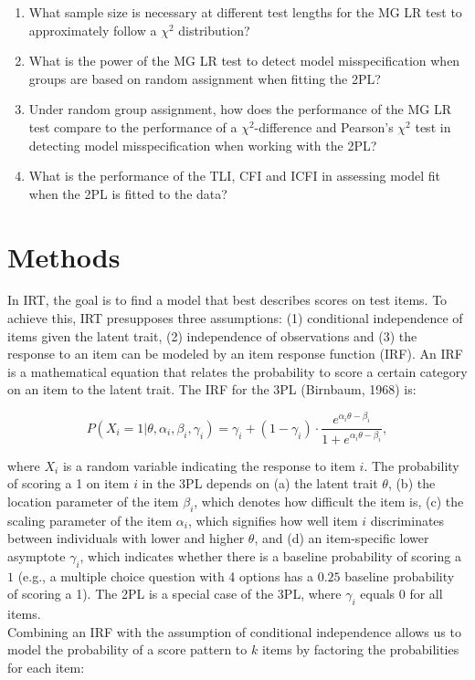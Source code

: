 \documentclass[Royal,sageapa,times,doublespace]{sagej}
\begin{document}
\begin{enumerate}
\item{What sample size is necessary at different test lengths for the MG LR test to approximately follow a $\chi^2$ distribution?}
\item{What is the power of the MG LR test to detect model misspecification when groups are based on random assignment when fitting the 2PL?}
\item{Under random group assignment, how does the performance of the MG LR test compare to the performance of a $\chi^2$-difference and Pearson's $\chi^2$ test in detecting model misspecification when working with the 2PL?}
\item{What is the performance of the TLI, CFI and ICFI in assessing model fit when the 2PL is fitted to the data?}
\end{enumerate}

\section{Methods}
In IRT, the goal is to find a model that best describes scores on test items. To achieve this, IRT presupposes three assumptions: (1) conditional independence of items given the latent trait, (2) independence of observations and (3) the response to an item can be modeled by an item response function (IRF). An IRF is a mathematical equation that relates the probability to score a certain category on an item to the latent trait. The IRF for the 3PL (Birnbaum, 1968) is:

\begin{equation}
P(X_i = 1 | \theta, \alpha_{i}, \beta_{i}, \gamma_{i}) = \gamma_{i} + (1 - \gamma_{i}) \cdot 
\frac{e^{\alpha_{i}\theta - \beta_{i}}}{1 + e^{\alpha_{i}\theta - \beta_{i}}},
\end{equation}

where $X_i$ is a random variable indicating the response to item $i$. The probability of scoring a 1 on item $i$ in the 3PL depends on (a) the latent trait $\theta$, (b) the location parameter of the item $\beta_{i}$, which denotes how difficult the item is, (c) the scaling parameter of the item $\alpha_{i}$, which signifies how well item $i$ discriminates between individuals with lower and higher $\theta$, and (d) an item-specific lower asymptote $\gamma_{i}$, which indicates whether there is a baseline probability of scoring a $1$ (e.g., a multiple choice question with 4 options has a $0.25$ baseline probability of scoring a 1). The 2PL is a special case of the 3PL, where $\gamma_{i}$ equals $0$ for all items. \\
\indent Combining an IRF with the assumption of conditional independence allows us to model the probability of a score pattern to $k$ items by factoring the probabilities for each item:
\end{document}
